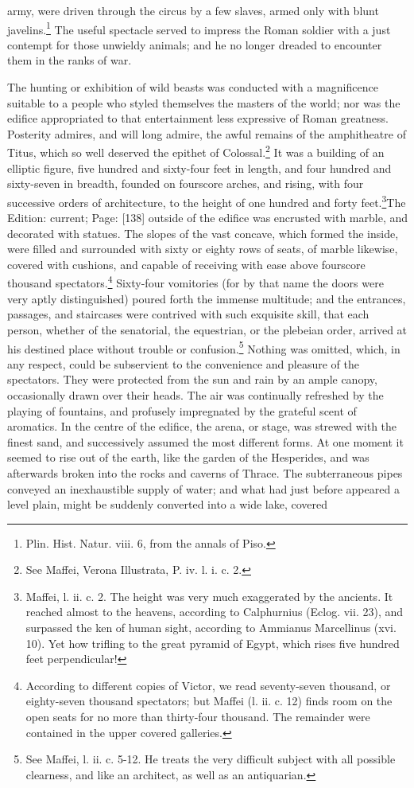 army, were driven through the circus by a few slaves, armed only with blunt javelins.\footnote{Plin. Hist. Natur. viii. 6, from the annals of Piso.} The useful spectacle served to impress the Roman soldier with a just contempt for those unwieldy animals; and he no longer dreaded to encounter them in the ranks of war.

The hunting or exhibition of wild beasts was conducted with a magnificence suitable to a people who styled themselves the masters of the world; nor was the edifice appropriated to that entertainment less expressive of Roman greatness. Posterity admires, and will long admire, the awful remains of the amphitheatre of Titus, which so well deserved the epithet of Colossal.\footnote{See Maffei, Verona Illustrata, P. iv. l. i. c. 2.} It was a building of an elliptic figure, five hundred and sixty-four feet in length, and four hundred and sixty-seven in breadth, founded on fourscore arches, and rising, with four successive orders of architecture, to the height of one hundred and forty feet.\footnote{Maffei, l. ii. c. 2. The height was very much exaggerated by the ancients. It reached almost to the heavens, according to Calphurnius (Eclog. vii. 23), and surpassed the ken of human sight, according to Ammianus Marcellinus (xvi. 10). Yet how trifling to the great pyramid of Egypt, which rises five hundred feet perpendicular!}The Edition: current; Page: [138] outside of the edifice was encrusted with marble, and decorated with statues. The slopes of the vast concave, which formed the inside, were filled and surrounded with sixty or eighty rows of seats, of marble likewise, covered with cushions, and capable of receiving with ease above fourscore thousand spectators.\footnote{According to different copies of Victor, we read seventy-seven thousand, or eighty-seven thousand spectators; but Maffei (l. ii. c. 12) finds room on the open seats for no more than thirty-four thousand. The remainder were contained in the upper covered galleries.} Sixty-four vomitories (for by that name the doors were very aptly distinguished) poured forth the immense multitude; and the entrances, passages, and staircases were contrived with such exquisite skill, that each person, whether of the senatorial, the equestrian, or the plebeian order, arrived at his destined place without trouble or confusion.\footnote{See Maffei, l. ii. c. 5-12. He treats the very difficult subject with all possible clearness, and like an architect, as well as an antiquarian.} Nothing was omitted, which, in any respect, could be subservient to the convenience and pleasure of the spectators. They were protected from the sun and rain by an ample canopy, occasionally drawn over their heads. The air was continually refreshed by the playing of fountains, and profusely impregnated by the grateful scent of aromatics. In the centre of the edifice, the arena, or stage, was strewed with the finest sand, and successively assumed the most different forms. At one moment it seemed to rise out of the earth, like the garden of the Hesperides, and was afterwards broken into the rocks and caverns of Thrace. The subterraneous pipes conveyed an inexhaustible supply of water; and what had just before appeared a level plain, might be suddenly converted into a wide lake, covered 